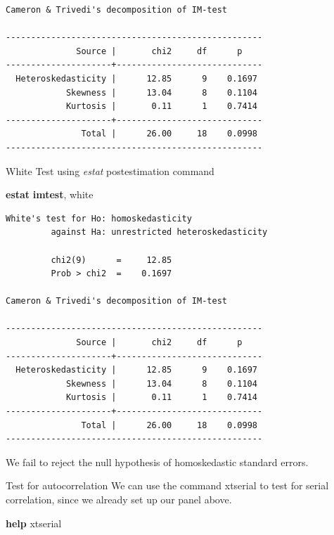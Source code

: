 \documentclass[
]{book}
\newenvironment{Shaded}{\begin{snugshade}}{\end{snugshade}}
\newcommand{\BaseNTok}[1]{\textcolor[rgb]{0.00,0.00,0.81}{#1}}
\newcommand{\KeywordTok}[1]{\textcolor[rgb]{0.13,0.29,0.53}{\textbf{#1}}}
\newcommand{\NormalTok}[1]{#1}
\begin{document}
\begin{verbatim}
Cameron & Trivedi's decomposition of IM-test

---------------------------------------------------
              Source |       chi2     df      p
---------------------+-----------------------------
  Heteroskedasticity |      12.85      9    0.1697
            Skewness |      13.04      8    0.1104
            Kurtosis |       0.11      1    0.7414
---------------------+-----------------------------
               Total |      26.00     18    0.0998
---------------------------------------------------
\end{verbatim}

White Test using \emph{estat} postestimation command

\begin{Shaded}
\begin{Highlighting}[]
\KeywordTok{estat} \KeywordTok{imtest}\NormalTok{, }\BaseNTok{white}
\end{Highlighting}
\end{Shaded}

\begin{verbatim}
White's test for Ho: homoskedasticity
         against Ha: unrestricted heteroskedasticity

         chi2(9)      =     12.85
         Prob > chi2  =    0.1697

Cameron & Trivedi's decomposition of IM-test

---------------------------------------------------
              Source |       chi2     df      p
---------------------+-----------------------------
  Heteroskedasticity |      12.85      9    0.1697
            Skewness |      13.04      8    0.1104
            Kurtosis |       0.11      1    0.7414
---------------------+-----------------------------
               Total |      26.00     18    0.0998
---------------------------------------------------
\end{verbatim}

We fail to reject the null hypothesis of homoskedastic standard errors.

Test for autocorrelation
We can use the command xtserial to test for serial correlation, since we already
set up our panel above.

\begin{Shaded}
\begin{Highlighting}[]
    \KeywordTok{help}\NormalTok{ xtserial}
\end{Highlighting}
\end{Shaded}
\end{document}
